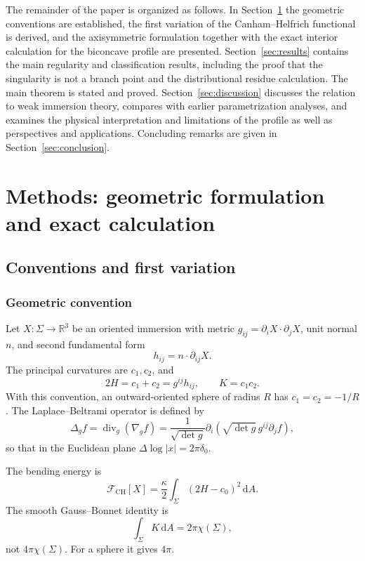\documentclass[preprint,amsmath,amssymb,aps,prl,superscriptaddress,nofootinbib,floatfix]{revtex4-2}
\newcommand{\dd}{\,\mathrm d}
\newcommand{\CH}{\mathrm{CH}}
\newcommand{\R}{\mathbb R}
\begin{document}
The remainder of the paper is organized as follows. In Section~\ref{sec:methods} the geometric conventions are established, the first variation of the Canham--Helfrich functional is derived, and the axisymmetric formulation together with the exact interior calculation for the biconcave profile are presented. Section~\ref{sec:results} contains the main regularity and classification results, including the proof that the singularity is not a branch point and the distributional residue calculation. The main theorem is stated and proved. Section~\ref{sec:discussion} discusses the relation to weak immersion theory, compares with earlier parametrization analyses, and examines the physical interpretation and limitations of the profile as well as perspectives and applications. Concluding remarks are given in Section~\ref{sec:conclusion}.

\section{Methods: geometric formulation and exact calculation}\label{sec:methods}

\subsection{Conventions and first variation}\label{sec:variation}

\subsubsection{Geometric convention}
Let \(X:\Sigma\to\R^3\) be an oriented immersion with metric \(g_{ij}=\partial_iX\cdot\partial_jX\), unit normal \(n\), and second fundamental form
\[
h_{ij}=n\cdot\partial_{ij}X.
\]
The principal curvatures are \(c_1,c_2\), and
\[
2H=c_1+c_2=g^{ij}h_{ij},\qquad K=c_1c_2.
\]
With this convention, an outward-oriented sphere of radius \(R\) has \(c_1=c_2=-1/R\). The Laplace--Beltrami operator is defined by
\[
\Delta_g f=\operatorname{div}_g(\nabla_g f)=\frac1{\sqrt{\det g}}\partial_i\!\left(\sqrt{\det g}\,g^{ij}\partial_jf\right),
\]
so that in the Euclidean plane \(\Delta\log|x|=2\pi\delta_0\).

The bending energy is
\begin{equation}
\mathcal F_{\CH}[X]=\frac\kappa2\int_\Sigma(2H-c_0)^2\dd A.\label{eq:energy}
\end{equation}
The smooth Gauss--Bonnet identity is
\begin{equation}
\int_\Sigma K\dd A=2\pi\chi(\Sigma),\label{eq:GB}
\end{equation}
not \(4\pi\chi(\Sigma)\). For a sphere it gives \(4\pi\).
\end{document}
